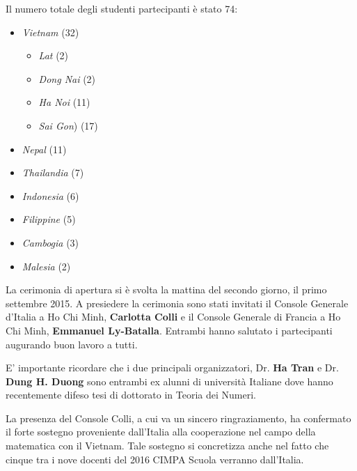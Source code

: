 \documentclass[12pt,a4paper]{letter}
\begin{document}
\begin{letter}
Il numero totale degli studenti partecipanti \`e stato 74:
\begin{itemize}
 \item \textit{Vietnam} (32) \vspace*{-2mm}
 \begin{itemize}
 \item \textit{Lat} (2)\vspace*{-2mm}
 \item \textit{Dong Nai} (2)\vspace*{-2mm}
 \item \textit{Ha Noi} (11)\vspace*{-2mm}
 \item \textit{Sai Gon}) (17)\vspace*{-2mm}
 \end{itemize}
\item \textit{Nepal} (11)\vspace*{-2mm}
\item \textit{Thailandia} (7)\vspace*{-2mm}
\item \textit{Indonesia} (6)\vspace*{-2mm}
\item \textit{Filippine} (5)\vspace*{-2mm}
\item \textit{Cambogia} (3)\vspace*{-2mm}
\item \textit{Malesia} (2)\vspace*{-2mm}
\end{itemize}



La cerimonia di apertura si \`e svolta la mattina del secondo giorno, il primo settembre 2015. 
A presiedere la cerimonia sono stati invitati il Console Generale d'Italia a Ho Chi Minh, \textbf{Carlotta Colli}
e il Console Generale di Francia a Ho Chi Minh, 
\textbf{Emmanuel Ly-Batalla}. Entrambi hanno salutato i partecipanti augurando buon lavoro a tutti. 

E' importante ricordare che i due principali organizzatori, Dr. \textbf{Ha Tran} e Dr. \textbf{Dung H. Duong} 
sono entrambi ex alunni di universit\`a Italiane
dove hanno recentemente difeso tesi di dottorato in Teoria dei Numeri.

La presenza del Console Colli, a cui va un sincero ringraziamento, ha confermato il forte sostegno proveniente dall'Italia 
alla cooperazione nel campo della matematica con il Vietnam. Tale sostegno si concretizza anche nel fatto che
cinque tra i nove docenti del 2016 CIMPA Scuola verranno dall'Italia.


\end{letter}
\end{document}
